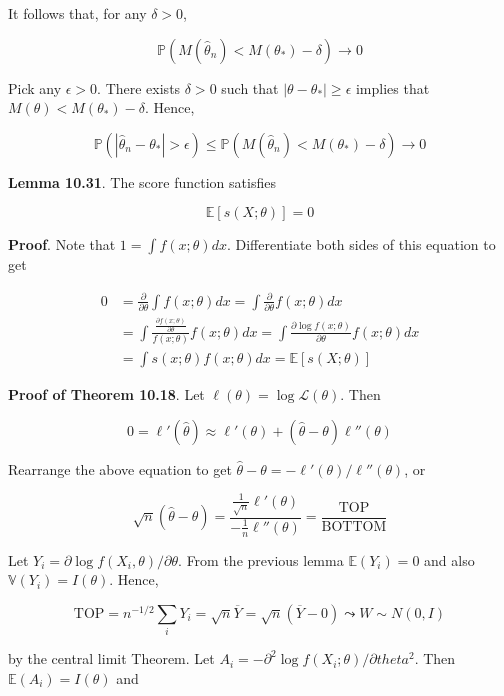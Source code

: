 It follows that, for any \(\delta > 0\),

\[\mathbb{P}(M(\hat{\theta}_{n}) < M(\theta_*) - \delta) \rightarrow 0\]

Pick any \(\epsilon > 0\). There exists \(\delta > 0\) such that
\(|\theta - \theta_*| \geq \epsilon\) implies that
\(M(\theta) < M(\theta_*) - \delta\). Hence,

\[\mathbb{P}(|\hat{\theta}_{n} - \theta_*| > \epsilon) \leq 
\mathbb{P}\left( M(\hat{\theta}_{n}) < M(\theta_*) - \delta \right) \rightarrow 0\]

\textbf{Lemma 10.31}. The score function satisfies

\[\mathbb{E}[s(X; \theta)] = 0\]

\textbf{Proof}. Note that \(1 = \int f(x; \theta) dx\). Differentiate
both sides of this equation to get

\begin{align*}
0 &= \frac{\partial}{\partial \theta} \int f(x; \theta)dx = \int \frac{\partial}{\partial \theta} f(x; \theta) dx \\
&= \int \frac{\frac{\partial f(x; \theta)}{\partial \theta}}{f(x; \theta)} f(x; \theta) dx
= \int \frac{\partial \log f(x; \theta)}{\partial \theta} f(x; \theta) dx \\
&= \int s(x; \theta) f(x; \theta) dx = \mathbb{E}[s(X; \theta)]
\end{align*}

\textbf{Proof of Theorem 10.18}. Let
\(\ell(\theta) = \log \mathcal{L}(\theta)\). Then

\[0 = \ell'(\hat{\theta}) \approx \ell'(\theta) + (\hat{\theta} - \theta) \ell''(\theta)\]

Rearrange the above equation to get
\(\hat{\theta} - \theta = -\ell'(\theta) / \ell''(\theta)\), or

\[ \sqrt{n}(\hat{\theta} - \theta) = \frac{\frac{1}{\sqrt{n}}\ell'(\theta)}{-\frac{1}{n}\ell''(\theta)} = \frac{\text{TOP}}{\text{BOTTOM}}\]

Let \(Y_{i} = \partial \log f(X_{i}, \theta) / \partial \theta\). From the
previous lemma \(\mathbb{E}(Y_{i}) = 0\) and also
\(\mathbb{V}(Y_{i}) = I(\theta)\). Hence,

\[\text{TOP} = n^{-1/2} \sum_{i} Y_{i} = \sqrt{n} \overline{Y} = \sqrt{n} (\overline{Y} - 0) \leadsto W \sim N(0, I)\]

by the central limit Theorem. Let
\(A_{i} = -\partial^{2} \log f(X_{i}; \theta) / \partial theta^{2}\). Then
\(\mathbb{E}(A_{i}) = I(\theta)\) and

